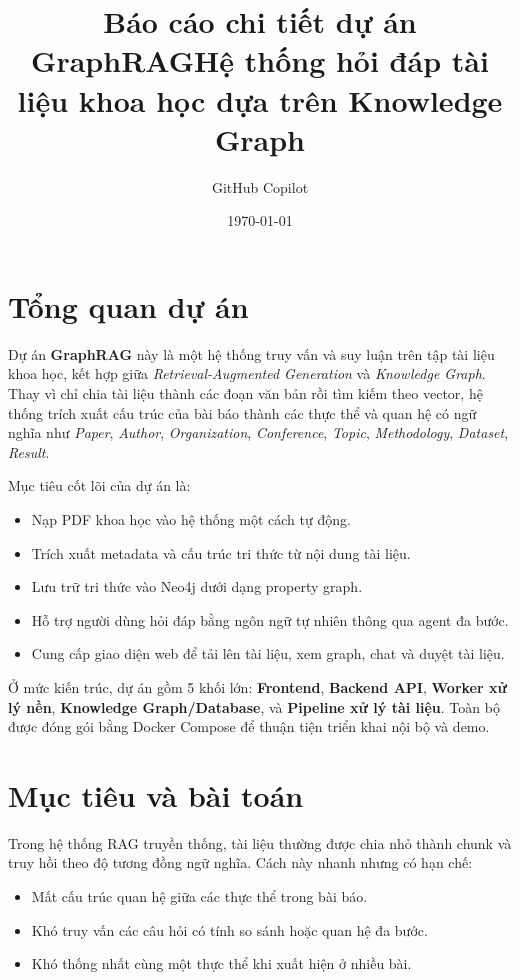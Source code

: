 \documentclass[12pt,a4paper]{article}
\title{\textbf{Báo cáo chi tiết dự án GraphRAG}\large Hệ thống hỏi đáp tài liệu khoa học dựa trên Knowledge Graph}
\author{GitHub Copilot}
\date{\today}
\begin{document}
\maketitle
\tableofcontents
\newpage

\section{Tổng quan dự án}
Dự án \textbf{GraphRAG} này là một hệ thống truy vấn và suy luận trên tập tài liệu khoa học, kết hợp giữa \textit{Retrieval-Augmented Generation} và \textit{Knowledge Graph}. Thay vì chỉ chia tài liệu thành các đoạn văn bản rồi tìm kiếm theo vector, hệ thống trích xuất cấu trúc của bài báo thành các thực thể và quan hệ có ngữ nghĩa như \textit{Paper}, \textit{Author}, \textit{Organization}, \textit{Conference}, \textit{Topic}, \textit{Methodology}, \textit{Dataset}, \textit{Result}.

Mục tiêu cốt lõi của dự án là:
\begin{itemize}[leftmargin=1.6em]
  \item Nạp PDF khoa học vào hệ thống một cách tự động.
  \item Trích xuất metadata và cấu trúc tri thức từ nội dung tài liệu.
  \item Lưu trữ tri thức vào Neo4j dưới dạng property graph.
  \item Hỗ trợ người dùng hỏi đáp bằng ngôn ngữ tự nhiên thông qua agent đa bước.
  \item Cung cấp giao diện web để tải lên tài liệu, xem graph, chat và duyệt tài liệu.
\end{itemize}

Ở mức kiến trúc, dự án gồm 5 khối lớn: \textbf{Frontend}, \textbf{Backend API}, \textbf{Worker xử lý nền}, \textbf{Knowledge Graph/Database}, và \textbf{Pipeline xử lý tài liệu}. Toàn bộ được đóng gói bằng Docker Compose để thuận tiện triển khai nội bộ và demo.

\section{Mục tiêu và bài toán}
Trong hệ thống RAG truyền thống, tài liệu thường được chia nhỏ thành chunk và truy hồi theo độ tương đồng ngữ nghĩa. Cách này nhanh nhưng có hạn chế:
\begin{itemize}[leftmargin=1.6em]
  \item Mất cấu trúc quan hệ giữa các thực thể trong bài báo.
  \item Khó truy vấn các câu hỏi có tính so sánh hoặc quan hệ đa bước.
  \item Khó thống nhất cùng một thực thể khi xuất hiện ở nhiều bài.
\end{itemize}
\end{document}
